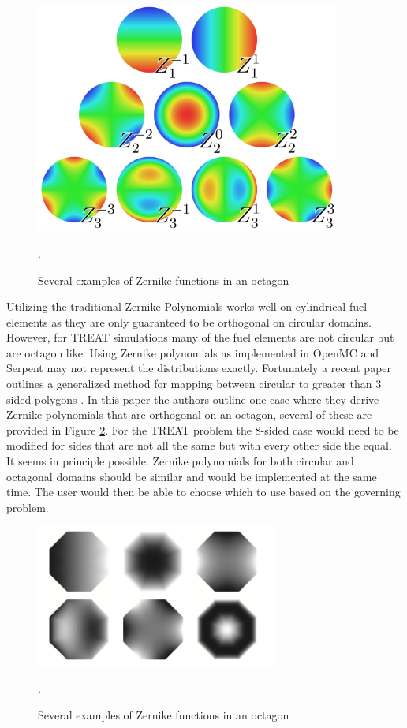 \documentclass[11pt]{article}
\begin{document}
\begin{figure}
    \centering
    \includegraphics[width=10cm]{figures/zernike-circle.png}
    \caption{Several examples of Zernike functions in an octagon \cite{ferreira2015orthogonal}}.
    \label{fig:zernike}
\end{figure}

Utilizing the traditional Zernike Polynomials works well on cylindrical fuel elements as they are only guaranteed to be orthogonal on circular domains.  However, for  TREAT simulations many of the fuel elements are not circular but are octagon like.  Using Zernike polynomials as implemented in OpenMC and Serpent may not represent the distributions exactly.  Fortunately a recent paper outlines a generalized method for mapping between circular to greater than 3 sided polygons \cite{ferreira2015orthogonal}.  In this paper the authors outline one case where they derive Zernike polynomials that are orthogonal on an octagon, several of these are provided in Figure \ref{fig:oct-fet}. For the TREAT problem the 8-sided case would need to be modified for sides that are not all the same but with every other side the equal.  It seems in principle possible.  Zernike polynomials for both circular and octagonal domains should be similar and would be implemented at the same time.  The user would then be able to choose which to use based on the governing problem.  
\begin{figure}
    \centering
    \includegraphics[width=8cm]{figures/octogon-FET.png}
    \caption{Several examples of Zernike functions in an octagon \cite{ferreira2015orthogonal}}.
    \label{fig:oct-fet}
\end{figure}
 
\end{document}
